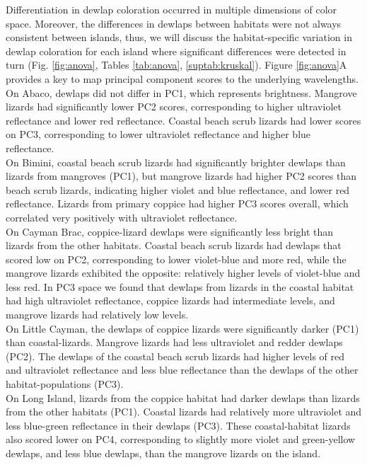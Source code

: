 Differentiation in dewlap coloration occurred in multiple dimensions of color space. Moreover, the differences in dewlaps between habitats were not always consistent between islands, thus, we will discuss the habitat-specific variation in dewlap coloration for each island where significant differences were detected in turn (Fig. \ref{fig:anova}, Tables \ref{tab:anova}, \ref{suptab:kruskal}). Figure \ref{fig:anova}A provides a key to map principal component scores to the underlying wavelengths.\\

On Abaco, dewlaps did not differ in PC1, which represents brightness. Mangrove lizards had significantly lower PC2 scores, corresponding to higher ultraviolet reflectance and lower red reflectance. Coastal beach scrub lizards had lower scores on PC3, corresponding to lower ultraviolet reflectance and higher blue reflectance.\\

On Bimini, coastal beach scrub lizards had significantly brighter dewlaps than lizards from mangroves (PC1), but mangrove lizards had higher PC2 scores than beach scrub lizards, indicating higher violet and blue reflectance, and lower red reflectance. Lizards from primary coppice had higher PC3 scores overall, which correlated very positively with ultraviolet reflectance.\\

On Cayman Brac, coppice-lizard dewlaps were significantly less bright than lizards from the other habitats. Coastal beach scrub lizards had dewlaps that scored low on PC2, corresponding to lower violet-blue and more red, while the mangrove lizards exhibited the opposite: relatively higher levels of violet-blue and less red. In PC3 space we found that dewlaps from lizards in the coastal habitat had high ultraviolet reflectance, coppice lizards had intermediate levels, and mangrove lizards had relatively low levels.\\

On Little Cayman, the dewlaps of coppice lizards were significantly darker (PC1) than coastal-lizards. Mangrove lizards had less ultraviolet and redder dewlaps (PC2). The dewlaps of the coastal beach scrub lizards had higher levels of red and ultraviolet reflectance and less blue reflectance than the dewlaps of the other habitat-populations (PC3).\\

On Long Island, lizards from the coppice habitat had darker dewlaps than lizards from the other habitats (PC1). Coastal lizards had relatively more ultraviolet and less blue-green reflectance in their dewlaps (PC3). These coastal-habitat lizards also scored lower on PC4, corresponding to slightly more violet and green-yellow dewlaps, and less blue dewlaps, than the mangrove lizards on the island.\\

